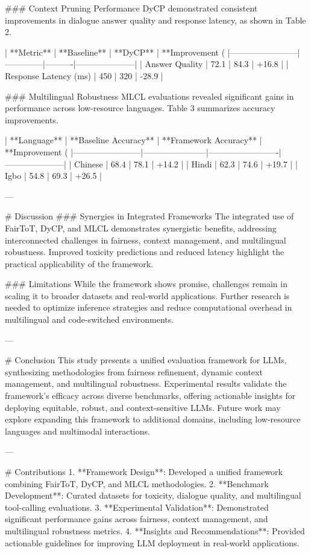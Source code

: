 ### Context Pruning Performance  
DyCP demonstrated consistent improvements in dialogue answer quality and response latency, as shown in Table 2.

| **Metric**            | **Baseline** | **DyCP** | **Improvement (%
|------------------------|--------------|----------|---------------------|
| Answer Quality        | 72.1         | 84.3     | +16.8               |
| Response Latency (ms) | 450          | 320      | -28.9               |

### Multilingual Robustness  
MLCL evaluations revealed significant gains in performance across low-resource languages. Table 3 summarizes accuracy improvements.

| **Language**          | **Baseline Accuracy** | **Framework Accuracy** | **Improvement (%
|------------------------|-----------------------|-------------------------|---------------------|
| Chinese               | 68.4                 | 78.1                   | +14.2               |
| Hindi                 | 62.3                 | 74.6                   | +19.7               |
| Igbo                  | 54.8                 | 69.3                   | +26.5               |

---

# Discussion  
### Synergies in Integrated Frameworks  
The integrated use of FairToT, DyCP, and MLCL demonstrates synergistic benefits, addressing interconnected challenges in fairness, context management, and multilingual robustness. Improved toxicity predictions and reduced latency highlight the practical applicability of the framework.

### Limitations  
While the framework shows promise, challenges remain in scaling it to broader datasets and real-world applications. Further research is needed to optimize inference strategies and reduce computational overhead in multilingual and code-switched environments.

---

# Conclusion  
This study presents a unified evaluation framework for LLMs, synthesizing methodologies from fairness refinement, dynamic context management, and multilingual robustness. Experimental results validate the framework's efficacy across diverse benchmarks, offering actionable insights for deploying equitable, robust, and context-sensitive LLMs. Future work may explore expanding this framework to additional domains, including low-resource languages and multimodal interactions.

---

# Contributions  
1. **Framework Design**: Developed a unified framework combining FairToT, DyCP, and MLCL methodologies.
2. **Benchmark Development**: Curated datasets for toxicity, dialogue quality, and multilingual tool-calling evaluations.
3. **Experimental Validation**: Demonstrated significant performance gains across fairness, context management, and multilingual robustness metrics.
4. **Insights and Recommendations**: Provided actionable guidelines for improving LLM deployment in real-world applications.

